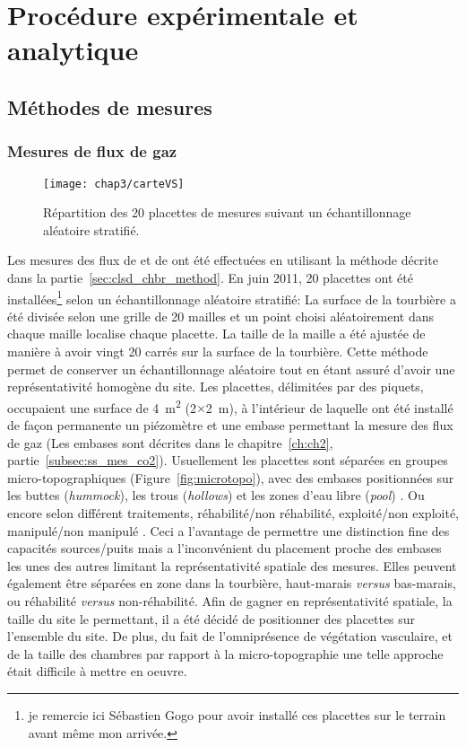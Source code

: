 \section{Procédure expérimentale et analytique}

\subsection{Méthodes de mesures}

\subsubsection{Mesures de flux de gaz}

\begin{figure}[t]
\centering
\texttt{[image: chap3/carteVS]}
\caption{Répartition des 20 placettes de mesures suivant un échantillonnage aléatoire stratifié.}
\label{fig:carteVS}
\end{figure}


Les mesures des flux de \coo et de \chh ont été effectuées en utilisant la méthode décrite dans la partie~\ref{sec:clsd_chbr_method}.
En juin 2011, 20 placettes ont été installées\footnote{je remercie ici Sébastien Gogo pour avoir installé ces placettes sur le terrain avant même mon arrivée.} selon un échantillonnage aléatoire stratifié:
La surface de la tourbière a été divisée selon une grille de 20 mailles et un point choisi aléatoirement dans chaque maille localise chaque placette.
La taille de la maille a été ajustée de manière à avoir vingt 20 carrés sur la surface de la tourbière.
Cette méthode permet de conserver un échantillonnage aléatoire tout en étant assuré d'avoir une représentativité homogène du site. 
Les placettes, délimitées par des piquets, occupaient une surface de \SI{4}{\square\metre} (2$\times$\SI{2}{\metre}), à l'intérieur de laquelle ont été installé de façon permanente un piézomètre et une embase permettant la mesure des flux de gaz (Les embases sont décrites dans le chapitre~\ref{ch:ch2}, partie~\ref{subsec:ss_mes_co2}).
Usuellement les placettes sont séparées en groupes micro-topographiques (Figure~\ref{fig:microtopo}), avec des embases positionnées sur les buttes (\textit{hummock}), les trous (\textit{hollows}) et les zones d'eau libre (\textit{pool}) \citep{Alm1997,waddington2000}.
Ou encore selon différent traitements, réhabilité/non réhabilité, exploité/non exploité, manipulé/non manipulé \citep{bortoluzzi2006,strack2013}.
Ceci a l'avantage de permettre une distinction fine des capacités sources/puits mais a l'inconvénient du placement proche des embases les unes des autres limitant la représentativité spatiale des mesures.
Elles peuvent également être séparées en zone dans la tourbière, haut-marais \textit{versus} bas-marais, ou réhabilité \textit{versus} non-réhabilité.
Afin de gagner en représentativité spatiale, la taille du site le permettant, il a été décidé de positionner des placettes sur l'ensemble du site.
De plus, du fait de l'omniprésence de végétation vasculaire, et de la taille des chambres par rapport à la micro-topographie une telle approche était difficile à mettre en oeuvre.

